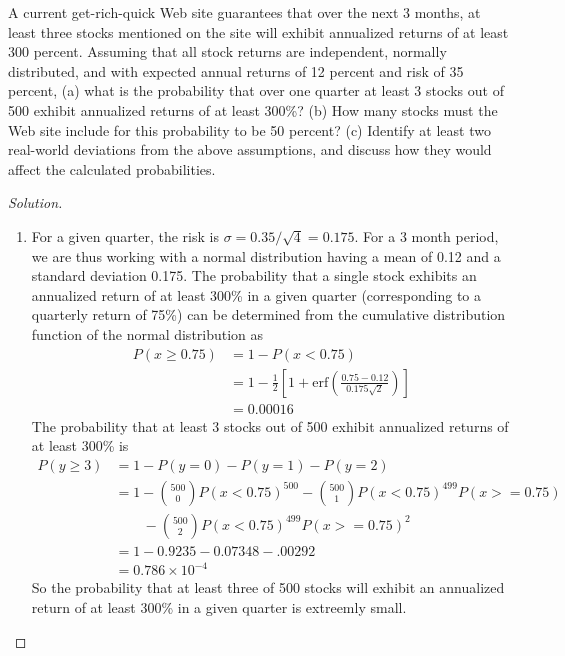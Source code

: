 \begin{problem}{12.8}
  A current get-rich-quick Web site guarantees that over the next 3 months, at least three stocks mentioned on the site will exhibit annualized returns of at least 300 percent. Assuming that all stock returns are independent, normally distributed, and with expected annual returns of 12 percent and risk of 35 percent, (a) what is the probability that over one quarter at least 3 stocks out of 500 exhibit annualized returns of at least 300\%? (b) How many stocks must the Web site include for this probability to be 50 percent? (c) Identify at least two real-world deviations from the above assumptions, and discuss how they would affect the calculated probabilities.
\end{problem}

\begin{proof}[Solution]
  \quad\\
  \begin{enumerate}[label=(\alph*)]
   \item{For a given quarter, the risk is $\sigma=0.35/\sqrt{4}=0.175$. For a 3 month period, we are thus working with a normal distribution having a mean of 0.12 and a standard deviation 0.175. The probability that a single stock exhibits an annualized return of at least 300\%  in a given quarter (corresponding to a quarterly return of 75\%) can be determined from the cumulative distribution function of the normal distribution as
   \begin{align*}
     P(x\ge 0.75) &= 1 - P(x<0.75) \\
	       &= 1 - \frac{1}{2}\left[ 1 + \mathrm{erf}\left(\frac{0.75-0.12}{0.175\sqrt{2}}\right)\right]\\
	       &= 0.00016
   \end{align*}
    The probability that at least 3 stocks out of 500 exhibit annualized returns of at least 300\% is
    \begin{align*}
     P(y\ge 3) &= 1 - P(y=0) - P(y=1) - P(y=2)\\
	       &= 1 - {500 \choose 0}P(x<0.75)^{500} - {500 \choose 1}P(x<0.75)^{499}P(x>=0.75) \\
	       & \qquad - {500 \choose 2}P(x<0.75)^{499}P(x>=0.75)^{2}\\
	       &= 1 - 0.9235 - 0.07348 - .00292 \\
	       &= 0.786\times 10^{-4}
    \end{align*}
    So the probability that at least three of 500 stocks will exhibit an annualized return of at least 300\% in a given quarter is extreemly small.
}
\end{enumerate}
\end{proof}
